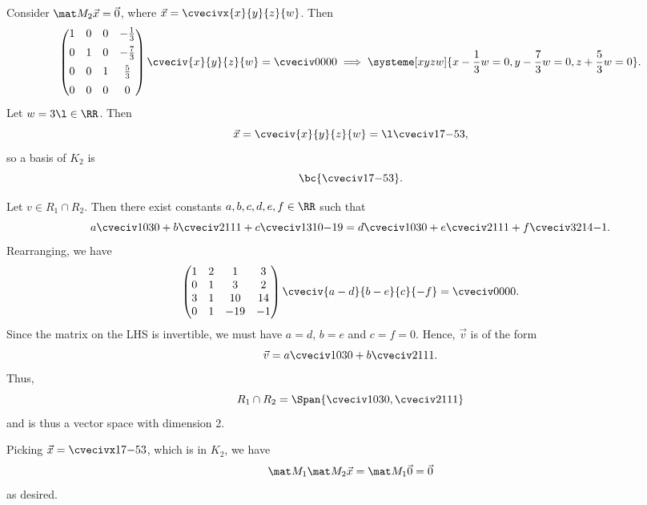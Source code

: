 \begin{solution}
\begin{ppart}
        Consider $\mat M_2 \vec x = \vec 0$, where $\vec x = \cvecivx{x}{y}{z}{w}$. Then \[\begin{pmatrix}1 & 0 & 0 & -\frac13 \\[0.5em] 0 & 1 & 0 & -\frac73 \\[0.5em] 0 & 0 & 1 & \frac53 \\[0.5em] 0 & 0 & 0 & 0\end{pmatrix} \cveciv{x}{y}{z}{w} = \cveciv0000 \implies \systeme[xyzw]{x - \frac13 w = 0, y - \frac73 w = 0, z + \frac53 w = 0}.\] Let $w = 3\l \in \RR$. Then \[\vec x = \cveciv{x}{y}{z}{w} = \l \cveciv17{-5}3,\] so a basis of $K_2$ is \[\bc{\cveciv17{-5}3}.\]
    \end{ppart}
    \begin{ppart}
        Let $v \in R_1 \cap R_2$. Then there exist constants $a, b, c, d, e, f \in \RR$ such that \[a \cveciv1030 + b \cveciv2111 + c\cveciv13{10}{-19} = d \cveciv1030 + e\cveciv2111 + f\cveciv32{14}{-1}.\] Rearranging, we have \[\begin{pmatrix}1 & 2 & 1 & 3 \\ 0 & 1 & 3 & 2 \\ 3 & 1 & 10 & 14 \\ 0 & 1 & -19 &-1\end{pmatrix} \cveciv{a-d}{b-e}{c}{-f} = \cveciv0000.\] Since the matrix on the LHS is invertible, we must have $a = d$, $b = e$ and $c = f = 0$. Hence, $\vec v$ is of the form \[\vec v = a \cveciv1030 + b \cveciv2111.\] Thus, \[R_1 \cap R_2 = \Span{\cveciv1030, \cveciv2111}\] and is thus a vector space with dimension 2.
    \end{ppart}
    \begin{ppart}
        Picking $\vec x = \cvecivx17{-5}3$, which is in $K_2$, we have \[\mat M_1 \mat M_2 \vec x = \mat M_1 \vec 0 = \vec 0\] as desired.
    \end{ppart}
\end{solution}

